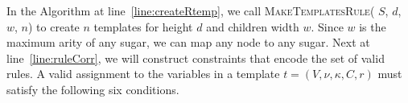 In the Algorithm at line~\ref{line:createRtemp}, we call \textsc{MakeTemplatesRule}( $S$, $d$, $w$, $n$) to create $n$ templates for
height $d$ and children width $w$.
Since $w$ is the maximum arity of any sugar, we can map any node to any sugar.
Next at line~\ref{line:ruleCorr}, we will construct constraints
that encode the set of valid rules. 
A valid assignment to the variables in
a template  $t = (V, \nu, \kappa, C, r)$ must
satisfy the following six conditions.
